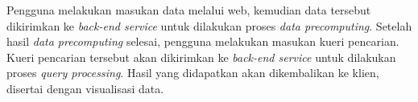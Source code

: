 Pengguna melakukan masukan data melalui web, kemudian data tersebut dikirimkan ke \textit{back-end service} untuk dilakukan proses \textit{data precomputing}. Setelah hasil \textit{data precomputing} selesai, pengguna melakukan masukan kueri pencarian. Kueri pencarian tersebut akan dikirimkan ke \textit{back-end service} untuk dilakukan proses \textit{query processing}. Hasil yang didapatkan akan dikembalikan ke klien, disertai dengan visualisasi data.
